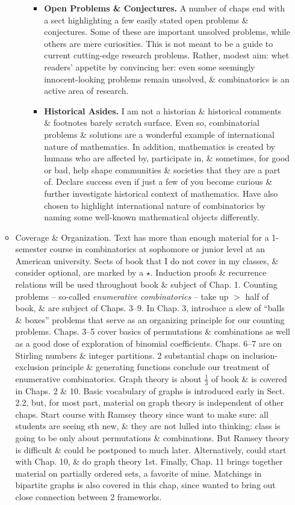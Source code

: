 \documentclass{article}
\begin{document}
\begin{itemize}
\begin{itemize}
\begin{itemize}
\begin{itemize}
				\item {\bf Open Problems \& Conjectures.} A number of chaps end with a sect highlighting a few easily stated open problems \& conjectures. Some of these are important unsolved problems, while others are mere curiosities. This is not meant to be a guide to current cutting-edge research problems. Rather, modest aim: whet readers' appetite by convincing her: even some seemingly innocent-looking problems remain unsolved, \& combinatorics is an active area of research.
				\item {\bf Historical Asides.} I am not a historian \& historical comments \& footnotes barely scratch surface. Even so, combinatorial problems \& solutions are a wonderful example of international nature of mathematics. In addition, mathematics is created by humans who are affected by, participate in, \& sometimes, for good or bad, help shape communities \& societies that they are a part of. Declare success even if just a few of you become curious \& further investigate historical context of mathematics. Have also chosen to highlight international nature of combinatorics by naming some well-known mathematical objects differently.
			\end{itemize}
		\end{itemize}
		\item {\sf Coverage \& Organization.} Text has more than enough material for a 1-semester course in combinatorics at sophomore or junior level at an American university. Sects of book that I do not cover in my classes, \& consider optional, are marked by a $\star$. Induction proofs \& recurrence relations will be used throughout book \& subject of Chap. 1. Counting problems -- so-called {\it enumerative combinatorics} -- take up $>$ half of book, \& are subject of Chaps. 3--9. In Chap. 3, introduce a slew of ``balls \& boxes'' problems that serve as an organizing principle for our counting problems. Chaps. 3--5 cover basics of permutations \& combinations as well as a good dose of exploration of binomial coefficients. Chaps. 6--7 are on Stirling numbers \& integer partitions. 2 substantial chaps on inclusion-exclusion principle \& generating functions conclude our treatment of enumerative combinatorics. Graph theory is about $\frac{1}{3}$ of book \& is covered in Chaps. 2 \& 10. Basic vocabulary of graphs is introduced early in Sect. 2.2, but, for most part, material on graph theory is independent of other chaps. Start course with Ramsey theory since want to make sure: all students are seeing sth new, \& they are not lulled into thinking: class is going to be only about permutations \& combinations. But Ramsey theory is difficult \& could be postponed to much later. Alternatively, could start with Chap. 10, \& do graph theory 1st. Finally, Chap. 11 brings together material on partially ordered sets, a favorite of mine. Matchings in bipartite graphs is also covered in this chap, since wanted to bring out close connection between 2 frameworks.
		

\end{itemize}
\end{itemize}
\end{document}
